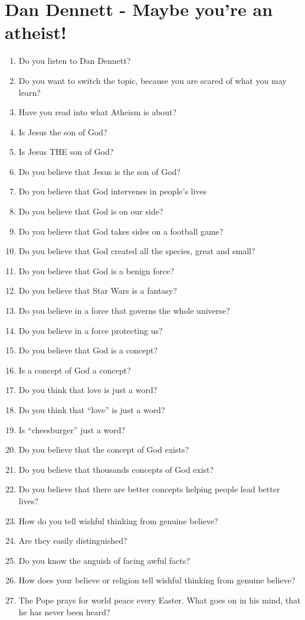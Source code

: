 \documentclass[10pt,a4paper]{article}
\begin{document}
\section{Dan Dennett - Maybe you're an atheist!}
\begin{enumerate}
	\item Do you listen to Dan Dennett?
	\item Do you want to switch the topic, because you are scared of what you may learn?
	\item Have you read into what Atheism is about?
	\item Is Jesus the son of God?
	\item Is Jesus THE son of God?
	\item Do you believe that Jesus is the son of God?
	\item Do you believe that God intervenes in people's lives
	\item Do you believe that God is on our side? 
	\item Do you believe that God takes sides on a football game?
	\item Do you believe that God created all the species, great and small?
	\item Do you believe that God is a benign force?
	\item Do you believe that Star Wars is a fantasy?
	\item Do you believe in a force that governs the whole universe?
	\item Do you believe in a force protecting us?
	\item Do you believe that God is a concept?
	\item Is a concept of God a concept?
	\item Do you think that love is just a word?
	\item Do you think that \enquote{love} is just a word?
	\item Is \enquote{cheesburger} just a word?
	\item Do you believe that the concept of God exists?
	\item Do you believe that thousands concepts of God exist?
	\item Do you believe that there are better concepts helping people lead better lives?
	\item How do you tell wishful thinking from genuine believe?
	\item Are they easily distinguished?
	\item Do you know the anguish of facing awful facts?
	\item How does your believe or religion tell wishful thinking from genuine believe?
	\item The Pope prays for world peace every Easter. What goes on in his mind, that he has never been heard?
\end{enumerate}
\end{document}
